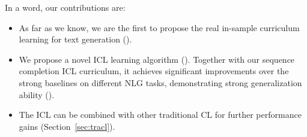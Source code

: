 %
In a word, our contributions are:
\begin{itemize}
	\item As far as we know, we are the first to propose the real in-sample curriculum learning
for text generation ().
	\item We propose a novel ICL learning algorithm (). 
Together with our sequence completion ICL curriculum, it achieves significant improvements over 
the strong baselines on different NLG tasks, demonstrating strong generalization ability
().
	\item The ICL can be combined with other traditional CL for further performance gains 
(Section~\ref{sec:tracl}). 
\end{itemize}

